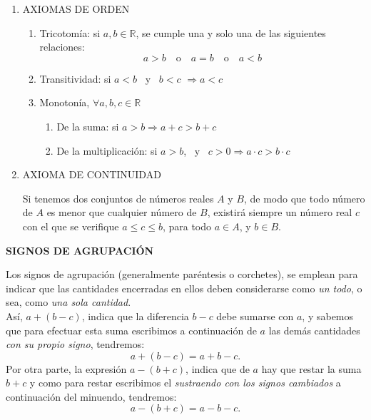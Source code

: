 \documentclass[12pt,letterpaper]{article}
\theoremstyle{definition}
\begin{document}
\begin{enumerate}[label=\Alph*.]
    \item AXIOMAS DE ORDEN
    \begin{enumerate}[label={\arabic*.}]
    \item Tricotomía: si $a,b\in \mathbb{R}$, se cumple una y solo una de las siguientes relaciones:
    \begin{equation*}
    a>b \quad\text{o}\quad a=b \quad\text{o}\quad a<b
    \end{equation*}
    \item Transitividad: si $a<b$ \ y \ $b<c$ $\Rightarrow a<c$
    \item Monotonía, $\forall a,b,c\in\mathbb{R}$
    	\begin{enumerate}[label=\alph*)]
    	\item De la suma: si $a>b \Rightarrow a+c>b+c$
        \item De la multiplicación: si $a>b$, \ y \ $c>0 \Rightarrow a\cdot c>b\cdot c$
    	\end{enumerate}
   	\end{enumerate}
    
    \item AXIOMA DE CONTINUIDAD \ 
    
    Si tenemos dos conjuntos de números reales $A$ y $B$, de modo que todo número de $A$ es menor que cualquier número de $B$, existirá siempre un número real $c$ con el que se verifique $a\leq c \leq b$, para todo $a\in A$, y $b\in B$.
    
\end{enumerate}

\pagebreak



\textbf{SIGNOS DE AGRUPACIÓN} %

Los signos de agrupación (generalmente paréntesis o corchetes), se emplean para indicar que las cantidades encerradas en ellos deben considerarse como \emph{un todo}, o sea, como \emph{una sola cantidad}.\\
Así, $a+(b-c)$, indica que la diferencia $b-c$ debe sumarse con $a$, y sabemos que para efectuar esta suma escribimos a continuación de $a$ las demás cantidades \emph{con su propio signo}, tendremos:
\begin{equation*}
a+(b-c)=a+b-c.
\end{equation*}
Por otra parte, la expresión $a-(b+c)$, indica que de $a$ hay que restar la suma $b+c$ y como para restar escribimos el \emph{sustraendo con los signos cambiados} a continuación del minuendo, tendremos:
\begin{equation*}
a-(b+c)=a-b-c.
\end{equation*}
\end{document}
